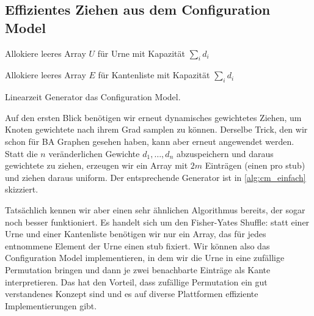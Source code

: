 \subsection{Effizientes Ziehen aus dem Configuration Model}
\begin{algorithm}[t]



    Allokiere leeres Array $U$ für Urne mit Kapazität $\sum_i d_i$\;

    Allokiere leeres Array $E$ für Kantenliste mit Kapazität $\sum_i d_i$\;

    \caption{Linearzeit Generator das Configuration Model.}
    \label{alg:cm_einfach}
    \vspace{1em}
\end{algorithm}


Auf den ersten Blick benötigen wir erneut dynamisches gewichtetes Ziehen, um Knoten gewichtete nach ihrem Grad samplen zu können.
Derselbe Trick, den wir schon für BA Graphen gesehen haben, kann aber erneut angewendet werden.
Statt die $n$ veränderlichen Gewichte $d_1, \ldots, d_n$ abzuspeichern und daraus gewichtete zu ziehen, erzeugen wir ein Array mit $2m$ Einträgen (einen pro stub) und ziehen daraus uniform.
Der entsprechende Generator ist in \cref{alg:cm_einfach} skizziert.

Tatsächlich kennen wir aber einen sehr ähnlichen Algorithmus bereits, der sogar noch besser funktioniert.
Es handelt sich um den Fisher-Yates Shuffle: statt einer Urne und einer Kantenliste benötigen wir nur ein Array, das für jedes entnommene Element der Urne einen stub fixiert.
Wir können also das Configuration Model implementieren, in dem wir die Urne in eine zufällige Permutation bringen und dann je zwei benachbarte Einträge als Kante interpretieren.
Das hat den Vorteil, dass zufällige Permutation ein gut verstandenes Konzept sind und es auf diverse Plattformen effiziente Implementierungen gibt.

